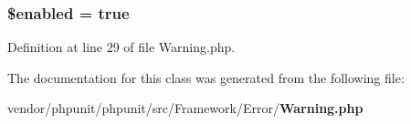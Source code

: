 \subsubsection[{\$enabled}]{\setlength{\rightskip}{0pt plus 5cm}\$enabled = true\hspace{0.3cm}{\ttfamily [static]}}\label{class_p_h_p_unit___framework___error___warning_a8d376199cc641e3e7af6e1a0d5c736d9}


Definition at line 29 of file Warning.\+php.



The documentation for this class was generated from the following file\+:\begin{DoxyCompactItemize}
\item 
vendor/phpunit/phpunit/src/\+Framework/\+Error/{\bf Warning.\+php}\end{DoxyCompactItemize}
